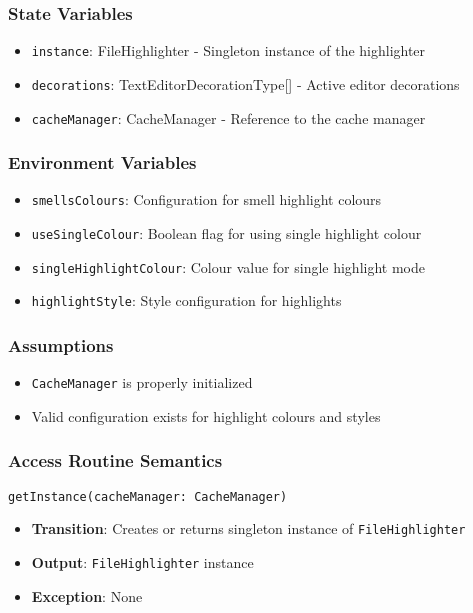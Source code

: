 \documentclass[12pt, titlepage]{article}
\begin{document}
\subsubsection{State Variables}
\begin{itemize}
\item \texttt{instance}: FileHighlighter - Singleton instance of the highlighter
\item \texttt{decorations}: TextEditorDecorationType[] - Active editor decorations
\item \texttt{cacheManager}:  CacheManager - Reference to the cache manager
\end{itemize}

\subsubsection{Environment Variables}
\begin{itemize}
\item \texttt{smellsColours}: Configuration for smell highlight colours
\item \texttt{useSingleColour}: Boolean flag for using single highlight colour
\item \texttt{singleHighlightColour}: Colour value for single highlight mode
\item \texttt{highlightStyle}: Style configuration for highlights
\end{itemize}

\subsubsection{Assumptions}
\begin{itemize}
\item \texttt{CacheManager} is properly initialized
\item Valid configuration exists for highlight colours and styles
\end{itemize}

\subsubsection{Access Routine Semantics}
\texttt{getInstance(cacheManager: CacheManager)}
\begin{itemize}
\item \textbf{Transition}: Creates or returns singleton instance of \texttt{FileHighlighter}
\item \textbf{Output}: \texttt{FileHighlighter} instance
\item \textbf{Exception}: None
\end{itemize}
\end{document}
